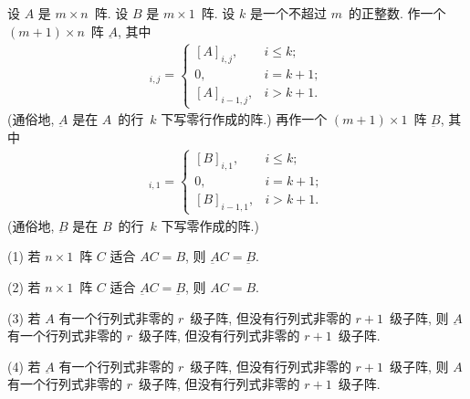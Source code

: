 \begin{theorem}[零的作用]
    设 \(A\) 是 \(m \times n\)~阵.
    设 \(B\) 是 \(m \times 1\)~阵.
    设 \(k\) 是一个不超过 \(m\)~的正整数.
    作一个 \((m + 1) \times n\)~阵 \(\underbar{A}\),
    其中
    \begin{align*}
        [\underbar{A}]_{i,j}
        = \begin{cases}
              [A]_{i,j},   & i \leq k;  \\
              0,           & i = k + 1; \\
              [A]_{i-1,j}, & i > k + 1.
          \end{cases}
    \end{align*}
    (通俗地, \(\underbar{A}\)
    是在 \(A\)~的行~\(k\) 下写零行作成的阵.)
    再作一个 \((m + 1) \times 1\)~阵 \(\underbar{B}\),
    其中
    \begin{align*}
        [\underbar{B}]_{i,1}
        = \begin{cases}
              [B]_{i,1},   & i \leq k;  \\
              0,           & i = k + 1; \\
              [B]_{i-1,1}, & i > k + 1.
          \end{cases}
    \end{align*}
    (通俗地, \(\underbar{B}\)
    是在 \(B\)~的行~\(k\) 下写零作成的阵.)

    (1)
    若 \(n \times 1\)~阵 \(C\) 适合
    \(AC = B\),
    则 \(\underbar{A}C = \underbar{B}\).

    (2)
    若 \(n \times 1\)~阵 \(C\) 适合
    \(\underbar{A}C = \underbar{B}\),
    则 \(AC = B\).

    (3)
    若 \(A\) 有一个行列式非零的 \(r\)~级子阵,
    但没有行列式非零的 \(r+1\)~级子阵,
    则 \(\underbar{A}\) 有一个行列式非零的 \(r\)~级子阵,
    但没有行列式非零的 \(r+1\)~级子阵.

    (4)
    若 \(\underbar{A}\) 有一个行列式非零的 \(r\)~级子阵,
    但没有行列式非零的 \(r+1\)~级子阵,
    则 \(A\) 有一个行列式非零的 \(r\)~级子阵,
    但没有行列式非零的 \(r+1\)~级子阵.
\end{theorem}

